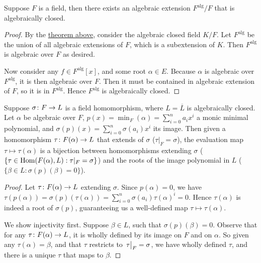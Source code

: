\begin{corollary}
    Suppose \(F\) is a field,
    then there exists an algebraic extension \(F^\text{alg}/F\)
    that is algebraically closed.
\end{corollary}
\begin{proof}
    By the \hyperref[thm:existence-alg-closure]{theorem above},
    consider the algebraic closed field \(K/F\).
    Let \(F^\text{alg}\) be the union of all algebraic extensions of \(F\),
    which is a subextension of \(K\).
    Then \(F^\text{alg}\) is algebraic over \(F\) as desired.

    Now consider any \(f \in F^\text{alg}[x]\), and some root \(\alpha \in E\).
    Because \(\alpha\) is algebraic over \(F^\text{alg}\),
    it is then algebraic over \(F\).
    Then it must be contained in algebraic extension of \(F\), so it is in \(F^\text{alg}\).
    Hence \(F^\text{alg}\) is algebraically closed.
\end{proof}

\begin{proposition}\label{prop:bijection-extension-roots}
    Suppose \(\sigma\colon F\to L\) is a field homomorphism,
    where \(L = \overline{L}\) is algebraically closed.
    Let \(\alpha\) be algebraic over \(F\),
    \(p(x) = \min_F(\alpha) = \sum_{i=0}^n a_i x^i\) a monic minimal polynomial,
    and \(\sigma(p)(x) = \sum_{i=0}^n \sigma(a_i)x^i\) its image.
    Then given a homomorphism \(\tau\colon F(\alpha)\to L\)
    that extends of \(\sigma\) (\(\tau\vert_F = \sigma\)),
    the evaluation map \(\tau \mapsto \tau(\alpha)\)
    is a bijection between homomorphisms extending \(\sigma\)
    (\(\{\tau\in\operatorname{Hom}(F(\alpha),L): \tau\vert_F = \sigma\}\))
    and the roots of the image polynomial in \(L\)
    (\(\{\beta \in L : \sigma(p)(\beta) = 0\}\)).
\end{proposition}
\begin{proof}
    Let \(\tau\colon F(\alpha)\to L\) extending \(\sigma\).
    Since \(p(\alpha) = 0\),
    we have \(\tau(p(\alpha)) = \sigma(p)(\tau(\alpha)) = \sum_{i=0}^n \sigma(a_i){\tau(\alpha)}^i = 0\).
    Hence \(\tau(\alpha)\) is indeed a root of \(\sigma(p)\),
    guaranteeing us a well-defined map \(\tau \mapsto \tau(\alpha)\).

    We show injectivity first.
    Suppose \(\beta \in L\), such that \(\sigma(p)(\beta) = 0\).
    Observe that for any \(\tau\colon F(\alpha)\to L\),
    it is wholly defined by its image on \(F\) and on \(\alpha\).
    So given any \(\tau(\alpha) = \beta\),
    and that \(\tau\) restricts to \(\eval{\tau}_F = \sigma\),
    we have wholly defined \(\tau\), and there is a unique \(\tau\) that maps to \(\beta\).
\end{proof}

